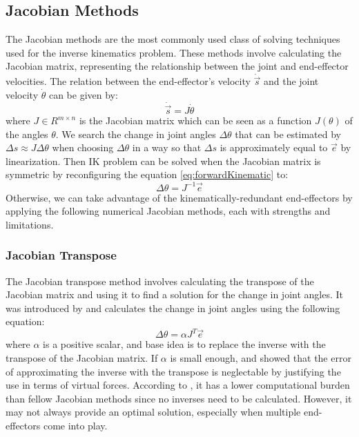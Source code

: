 \documentclass[conference]{IEEEtran}
\begin{document}
\subsection{Jacobian Methods}\label{JacobianMethods}
The Jacobian methods are the most commonly used class of solving techniques used for the inverse kinematics problem. These methods involve calculating the Jacobian matrix, representing the relationship between the joint and end-effector velocities. The relation between the end-effector's velocity $\dot{\vec{s}}$ and the joint velocity $\dot{\theta}$ can be given by:
\begin{equation}\label{eq:forwardKinematic}
    \dot{\vec{s}} = J\dot{\theta}
\end{equation}
where $J \in R^{m \times n}$ is the Jacobian matrix which can be seen as a function $J(\theta)$ of the angles $\theta$. We search the change in joint angles $\Delta\theta$ that can be estimated by $\Delta s \approx J\Delta\theta$ when choosing $\Delta \theta$ in a way so that $\Delta s$ is approximately equal to $\vec{e}$ by linearization.
Then IK problem can be solved when the Jacobian matrix is symmetric by reconfiguring the equation \eqref{eq:forwardKinematic} to:
\begin{equation}\label{eq:inverseKinematic}
    \Delta\theta = J^{-1}\vec{e}
\end{equation}
Otherwise, we can take advantage of the kinematically-redundant end-effectors by applying the following numerical Jacobian methods, each with strengths and limitations.

\subsubsection{Jacobian Transpose}
The Jacobian transpose method involves calculating the transpose of the Jacobian matrix and using it to find a solution for the change in joint angles. It was introduced by \cite{wolovich_computational_1984} \cite{balestrino_robust_1984} and calculates the change in joint angles using the following equation:
\begin{equation}
\Delta\theta = \alpha J^T\vec{e}
\end{equation}
where $\alpha$ is a positive scalar, and base idea is to replace the inverse with the transpose of the Jacobian matrix. If $\alpha$ is small enough, \cite{balestrino_robust_1984} and \cite{wolovich_computational_1984} showed that the error of approximating the inverse with the transpose is neglectable by justifying the use in terms of virtual forces. According to \cite{buss_introduction_2004}, it has a lower computational burden than fellow Jacobian methods since no inverses need to be calculated. However, it may not always provide an optimal solution, especially when multiple end-effectors come into play.
\end{document}
